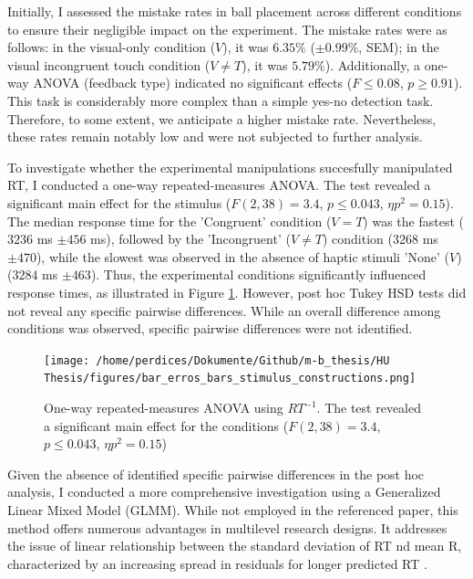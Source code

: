 \documentclass[12pt,oneside,openright]{report}
\begin{document}
Initially, I assessed the mistake rates in ball placement across different conditions to ensure their negligible impact on the experiment. The mistake rates were as follows: in the visual-only condition ($V$), it was $6.35\%$ ($\pm 0.99\%$, SEM); in the visual incongruent touch condition ($V \neq T$), it was $5.79\%$). Additionally, a one-way ANOVA (feedback type) indicated no significant effects ($ F \leq 0.08$, $p \geq 0.91$). This task is considerably more complex than a simple yes-no detection task. Therefore, to some extent, we anticipate a higher mistake rate. Nevertheless, these rates remain notably low and were not subjected to further analysis.

To investigate whether the experimental manipulations succesfully manipulated RT, I conducted a one-way repeated-measures ANOVA. The test revealed a significant main effect for the stimulus ($F(2,38) = 3.4$, $p \leq 0.043$, $\eta p^2 = 0.15$). The median response time for the 'Congruent' condition ($V=T$) was the fastest ($3236$ ms $\pm 456$ ms), followed by the 'Incongruent' ($V \neq T$) condition ($3268$ ms $\pm 470$), while the slowest was observed in the absence of haptic stimuli 'None' ($V$) ($3284$ ms $\pm 463$). Thus, the experimental conditions significantly influenced response times, as illustrated in Figure \ref{fig:error}. However, post hoc Tukey HSD tests did not reveal any specific pairwise differences. While an overall difference among conditions was observed, specific pairwise differences were not identified.

\begin{figure}[!ht]
    \centering
    \texttt{[image: /home/perdices/Dokumente/Github/m-b\_thesis/HU Thesis/figures/bar\_erros\_bars\_stimulus\_constructions.png]}
    \caption{One-way repeated-measures ANOVA using $RT^{-1}$. The test revealed a significant main effect for the conditions ($F(2,38) = 3.4$, $p \leq 0.043$, $\eta p^2 = 0.15$)}
    \label{fig:error}
\end{figure}

Given the absence of identified specific pairwise differences in the post hoc analysis, I conducted a more comprehensive investigation using a Generalized Linear Mixed Model (GLMM). While not employed in the referenced paper, this method offers numerous advantages in multilevel research designs. It addresses the issue of linear relationship between the standard deviation of RT nd mean R, characterized by an increasing spread in residuals for longer predicted RT  \parencite{Lo2015-fv}.
\end{document}
